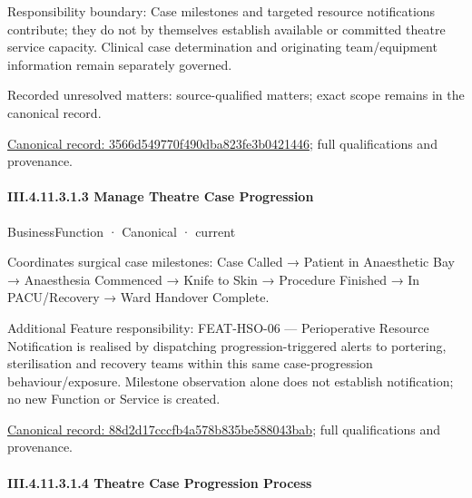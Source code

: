 Responsibility boundary: Case milestones and targeted resource notifications contribute; they do not by themselves establish available or committed theatre service capacity. Clinical case determination and originating team/equipment information remain separately governed.


{\small Recorded unresolved matters: source-qualified matters; exact scope remains in the canonical record.}\par
{\footnotesize \href{../../../../../../../../continuum/business/business-function/3566d549770f490dba823fe3b0421446.md}{Canonical record: 3566d549770f490dba823fe3b0421446}; full qualifications and provenance.}\par
\paragraph*{III.4.11.3.1.3 Manage Theatre Case Progression}
\label{navigation:III.4.11.3.1.3}

\label{element:88d2d17cccfb4a578b835be588043bab}
{\small BusinessFunction · Canonical · current}\par

Coordinates surgical case milestones: Case Called → Patient in Anaesthetic Bay → Anaesthesia Commenced → Knife to Skin → Procedure Finished → In PACU/Recovery → Ward Handover Complete.



Additional Feature responsibility: FEAT-HSO-06 — Perioperative Resource Notification is realised by dispatching progression-triggered alerts to portering, sterilisation and recovery teams within this same case-progression behaviour/exposure. Milestone observation alone does not establish notification; no new Function or Service is created.


{\footnotesize \href{../../../../../../../../continuum/business/business-function/88d2d17cccfb4a578b835be588043bab.md}{Canonical record: 88d2d17cccfb4a578b835be588043bab}; full qualifications and provenance.}\par
\paragraph*{III.4.11.3.1.4 Theatre Case Progression Process}
\label{navigation:III.4.11.3.1.4}

